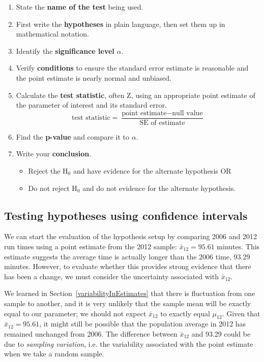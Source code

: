 \begin{termBox}{
\begin{enumerate}
\setlength{\itemsep}{0mm}
\item State the \textbf{name of the test} being used.
\item First write the \textbf{hypotheses} in plain language, then set them up in mathematical notation.
\item Identify the \textbf{significance level} $\alpha$.
\item Verify \textbf{conditions} to ensure the standard error estimate is reasonable and the point estimate is nearly normal and unbiased.
\item Calculate the \textbf{test statistic}, often Z, using an appropriate point estimate of the parameter of interest and its standard error.
$$\text{test statistic} = \frac{\text{point estimate} - \text{null value}}{\text{SE of estimate}}$$
\item Find the \textbf{p-value} and compare it to $\alpha$.
\item Write your \textbf{conclusion}.  
\begin{itemize}
\item Reject the H$_0$ and have evidence for the alternate hypothesis OR
\item Do not reject H$_0$ and do not evidence for the alternate hypothesis.
\end{itemize}
\end{enumerate}}
\end{termBox}

\subsection{Testing hypotheses using confidence intervals}
\label{utilizingOurCI}

We can start the evaluation of the hypothesis setup by comparing 2006 and 2012 run times using a point estimate from the 2012 sample: $\bar{x}_{12} = 95.61$ minutes. This estimate suggests the average time is actually longer than the 2006 time, 93.29 minutes. However, to evaluate whether this provides strong evidence that there has been a change, we must consider the uncertainty associated with $\bar{x}_{12}$.

We learned in Section~\ref{variabilityInEstimates} that there is fluctuation from one sample to another, and it is very unlikely that the sample mean will be exactly equal to our parameter; we should not expect $\bar{x}_{12}$ to exactly equal $\mu_{12}$. Given that $\bar{x}_{12} = 95.61$, it might still be possible that the population average in 2012 has remained unchanged from 2006. The difference between $\bar{x}_{12}$ and 93.29 could be due to \emph{sampling variation}, i.e. the variability associated with the point estimate when we take a random sample.

